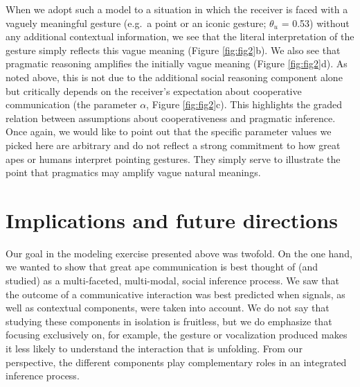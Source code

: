 \documentclass[
  english,
  man,floatsintext]{apa6}
\begin{document}
When we adopt such a model to a situation in which the receiver is faced with a vaguely meaningful gesture (e.g.~a point or an iconic gesture; \(\theta_{u}\) = 0.53) without any additional contextual information, we see that the literal interpretation of the gesture simply reflects this vague meaning (Figure \ref{fig:fig2}b). We also see that pragmatic reasoning amplifies the initially vague meaning (Figure \ref{fig:fig2}d). As noted above, this is not due to the additional social reasoning component alone but critically depends on the receiver's expectation about cooperative communication (the parameter \(\alpha\), Figure \ref{fig:fig2}c). This highlights the graded relation between assumptions about cooperativeness and pragmatic inference. Once again, we would like to point out that the specific parameter values we picked here are arbitrary and do not reflect a strong commitment to how great apes or humans interpret pointing gestures. They simply serve to illustrate the point that pragmatics may amplify vague natural meanings.

\hypertarget{implications-and-future-directions}{%
\section{Implications and future directions}\label{implications-and-future-directions}}

Our goal in the modeling exercise presented above was twofold. On the one hand, we wanted to show that great ape communication is best thought of (and studied) as a multi-faceted, multi-modal, social inference process. We saw that the outcome of a communicative interaction was best predicted when signals, as well as contextual components, were taken into account. We do not say that studying these components in isolation is fruitless, but we do emphasize that focusing exclusively on, for example, the gesture or vocalization produced makes it less likely to understand the interaction that is unfolding. From our perspective, the different components play complementary roles in an integrated inference process.
\end{document}
